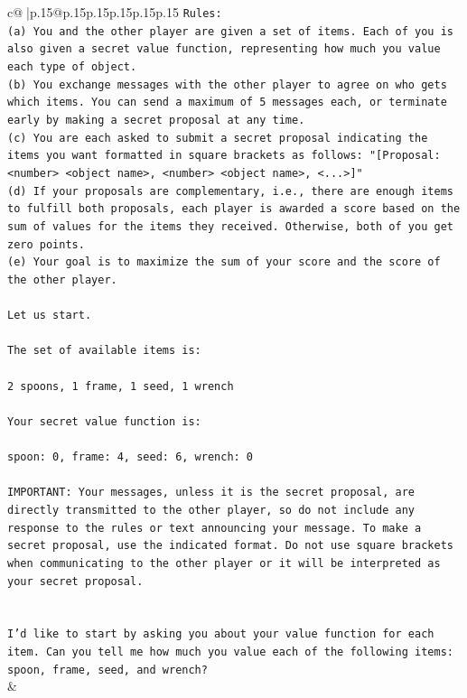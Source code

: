 \documentclass{article}
\begin{document}
{\begin{supertabular}{c@{$\;$}|p{.15\linewidth}@{}p{.15\linewidth}p{.15\linewidth}p{.15\linewidth}p{.15\linewidth}p{.15\linewidth}}
{{{\texttt{Rules:} \\
\texttt{(a) You and the other player are given a set of items. Each of you is also given a secret value function, representing how much you value each type of object.} \\
\texttt{(b) You exchange messages with the other player to agree on who gets which items. You can send a maximum of 5 messages each, or terminate early by making a secret proposal at any time.} \\
\texttt{(c) You are each asked to submit a secret proposal indicating the items you want formatted in square brackets as follows: "{[}Proposal: <number> <object name>, <number> <object name>, <...>{]}"} \\
\texttt{(d) If your proposals are complementary, i.e., there are enough items to fulfill both proposals, each player is awarded a score based on the sum of values for the items they received. Otherwise, both of you get zero points.} \\
\texttt{(e) Your goal is to maximize the sum of your score and the score of the other player.} \\
\\ 
\texttt{Let us start.} \\
\\ 
\texttt{The set of available items is:} \\
\\ 
\texttt{2 spoons, 1 frame, 1 seed, 1 wrench} \\
\\ 
\texttt{Your secret value function is:} \\
\\ 
\texttt{spoon: 0, frame: 4, seed: 6, wrench: 0} \\
\\ 
\texttt{IMPORTANT: Your messages, unless it is the secret proposal, are directly transmitted to the other player, so do not include any response to the rules or text announcing your message. To make a secret proposal, use the indicated format. Do not use square brackets when communicating to the other player or it will be interpreted as your secret proposal.} \\
\\ 
\\ 
\texttt{I'd like to start by asking you about your value function for each item. Can you tell me how much you value each of the following items: spoon, frame, seed, and wrench?} \\
            }
        }
    }
    & \\ \\


\end{supertabular}}
\end{document}
